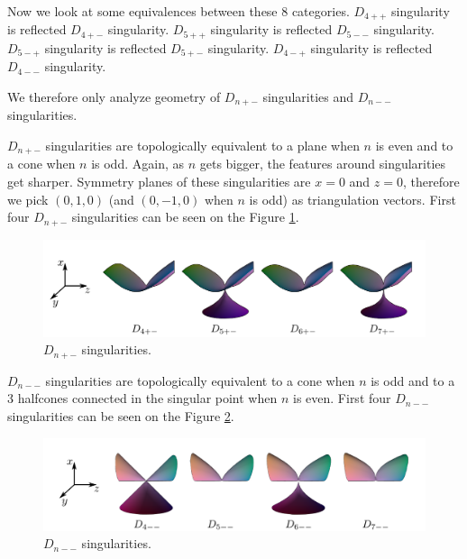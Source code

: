 Now we look at some equivalences between these 8 categories.
$D_{4++}$ singularity is reflected $D_{4+-}$ singularity.
$D_{5++}$ singularity is reflected $D_{5--}$ singularity.
$D_{5-+}$ singularity is reflected $D_{5+-}$ singularity.
$D_{4-+}$ singularity is reflected $D_{4--}$ singularity.

We therefore only analyze geometry of $D_{n+-}$ singularities and
$D_{n--}$ singularities.

$D_{n+-}$ singularities are topologically equivalent to a plane when $n$ is
even and to a cone when $n$ is odd. Again, as $n$ gets bigger, the features
around singularities get sharper. Symmetry planes of these singularities
are $x=0$ and $z=0$, therefore we pick $(0, 1, 0)$ (and $(0, -1, 0)$ when $n$ is odd)
as triangulation vectors. First four $D_{n+-}$ singularities can be seen on
the Figure \ref{img:7}.

\begin{figure}
    \centerline{\includegraphics[scale=0.5]{images/img7}}
    \caption[$D_{n+-}$ singularities]
    {$D_{n+-}$ singularities. \cite{morris2003client}}
    \label{img:7}
\end{figure}


$D_{n--}$ singularities are topologically equivalent to a cone when $n$ is
odd and to a 3 halfcones connected in the singular point when $n$ is even.
First four $D_{n--}$ singularities can be seen on the Figure \ref{img:8}.

\begin{figure}
    \centerline{\includegraphics[scale=0.5]{images/img8}}
    \caption[$D_{n--}$ singularities]
    {$D_{n--}$ singularities. \cite{morris2003client}}
    \label{img:8}
\end{figure}

